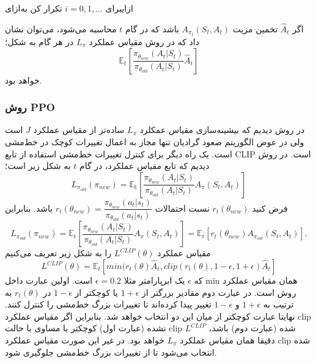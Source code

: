 
‌ازای{برای 
	$i=0,1,...$
	 تکرار کن}
‌به‌ازای

اگر $\hat{A}_t$ تخمین مزیت 
$A_{\pi_t}(S_t, A_t)$
باشد که در گام $t$ محاسبه می‌شود، می‌توان نشان داد که در روش
  مقیاس عملکرد $L_\pi$ در هر گام به شکل؛
$$\mathbb{E}_t\left[\dfrac{\pi_{\theta_{new}}(A_t| S_t)}{\pi_{\theta_{old}}(A_t|S_t)} \hat{A}_t \right]$$خواهد بود.
\subsubsection{روش PPO}
در روش  دیدیم که بیشینه‌سازی مقیاس عمکلرد $L_\pi$ ساده‌تر از مقیاس عملکرد $J$ است ولی در عوض الگوریتم صعود گرادیان تنها مجاز به اعمال تغییرات کوچک در خط‌مشی است. یک راه دیگر برای کنترل تغییرات خط‌مشی استفاده از تابع CLIP است. در روش
  دیدیم که  تابع مقیاس عملکرد، در گام $t$ به شکل زیر است؛
$$L_{\pi_{old}}(\pi_{new}) = \mathbb{E_t}\left[\dfrac{\pi_{\theta_{new}}(A_t| S_t)}{\pi_{\theta_{old}}(A_t|S_t)} A_{\pi}(S_t, A_t)\right]$$
فرض کنید 
$r_t(\theta_{new})$
 نسبت احتمالات 
$r_t(\theta_{new}) = \dfrac{\pi_{\theta_{new}}(a_t|s_t)}{\pi_{\theta_{old}}(a_t|s_t)}$ باشد. بنابراین
$$L_{\pi_{old}}(\pi_{new}) = \mathbb{E}_t\left[\dfrac{\pi_{\theta_{new}}(A_t| S_t)}{\pi_{\theta_{old}}(A_t|S_t)} A_{\pi}(S_t, A_t)\right] = \mathbb{E}_t\left[r_t(\theta_{new}) A_{\pi_{old}}(S_t,A_t)\right].$$ مقیاس عملکرد  $L^{CLIP}(\theta)$ را به شکل زیر تعریف می‌کنیم
$$L^{CLIP}(\theta) = \mathbb{E}_t\left[min(r_t(\theta) \hat{A}_t, clip(r_t(\theta), 1-\epsilon, 1+\epsilon) \hat{A}_t \right]$$
که $\epsilon$ یک ابرپارامتر  مثلا 
$\epsilon=0.2$
است. اولین عبارت داخل min همان مقیاس عملکرد روش  است. در عبارت دوم مقادیر بزرگتر از $1+\epsilon$ یا کوچکتر از 
$1-\epsilon$
در $r_t(\theta)$ به ترتیب به $1+\epsilon$ و $1-\epsilon$ تغییر پیدا کرده‌اند تا تغییرات بزرگ خط‌مشی را کنترل کنند. نهایتا عبارت کوچکتر از میان این دو انتخاب خواهد شد. بنابراین اگر مقیاس عملکرد clip نشده (عبارت اول) کوچکتر یا مساوی با حالت clip شده (عبارت دوم) باشد، $L^{CLIP}$ دقیقا همان مقیاس عملکرد $L_\pi$ خواهد بود. در غیر این صورت مقیاس عملکرد clip شده انتخاب می‌شود تا از تغییرات بزرگ خط‌مشی جلوگیری شود.

